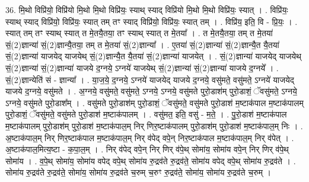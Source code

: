 \documentclass[17pt]{extarticle}
\begin{document}
36. मि॒थो विप्रि॑यो॒ विप्रि॑यो मि॒थो मि॒थो विप्रि॑यः॒ स्याथ् स्याद् विप्रि॑यो मि॒थो मि॒थो विप्रि॑यः॒ स्यात् । . विप्रि॑यः॒ स्याथ् स्याद् विप्रि॑यो॒ विप्रि॑यः॒ स्यात् तम् तꣳ स्याद् विप्रि॑यो॒ विप्रि॑यः॒ स्यात् तम् । . विप्रि॑य॒ इति॒ वि - प्रि॒यः॒ । . स्यात् तम् तꣳ स्याथ् स्यात् त मे॒तयै॒तया॒ तꣳ स्याथ् स्यात् त मे॒तया᳚ । . त मे॒तयै॒तया॒ तम् त मे॒तया॑ सं॒(2)ज्ञान्या॑ सं॒(2)ज्ञान्यै॒तया॒ तम् त मे॒तया॑ सं॒(2)ज्ञान्या᳚ । . ए॒तया॑ सं॒(2)ज्ञान्या॑ सं॒(2)ज्ञान्यै॒त यै॒तया॑ सं॒(2)ज्ञान्या॑ याजयेद् याजयेथ् सं॒(2)ज्ञान्यै॒त यै॒तया॑ सं॒(2)ज्ञान्या॑ याजयेत् । . सं॒(2)ज्ञान्या॑ याजयेद् याजयेथ् सं॒(2)ज्ञान्या॑ सं॒(2)ज्ञान्या॑ याजये द॒ग्नये॒ ऽग्नये॑ याजयेथ् सं॒(2)ज्ञान्या॑ 
सं॒(2)ज्ञान्या॑ याजये द॒ग्नये᳚ । . सं॒(2)ज्ञान्येति॑ सं - ज्ञान्या᳚ । . या॒ज॒ये॒ द॒ग्नये॒ ऽग्नये॑ याजयेद् याजये द॒ग्नये॒ वसु॑मते॒ वसु॑मते॒ ऽग्नये॑ याजयेद् याजये द॒ग्नये॒ वसु॑मते । . अ॒ग्नये॒ वसु॑मते॒ वसु॑मते॒ ऽग्नये॒ ऽग्नये॒ वसु॑मते पुरो॒डाश॑म् पुरो॒डाशं॒ ॅवसु॑मते॒ ऽग्नये॒ ऽग्नये॒ वसु॑मते पुरो॒डाश᳚म् । . वसु॑मते पुरो॒डाश॑म् पुरो॒डाशं॒ ॅवसु॑मते॒ वसु॑मते पुरो॒डाश॑ म॒ष्टाक॑पाल म॒ष्टाक॑पालम् पुरो॒डाशं॒ ॅवसु॑मते॒ वसु॑मते पुरो॒डाश॑ म॒ष्टाक॑पालम् । . वसु॑मत॒ इति॒ वसु॑ - म॒ते॒ । . पु॒रो॒डाश॑ म॒ष्टाक॑पाल म॒ष्टाक॑पालम् पुरो॒डाश॑म् पुरो॒डाश॑ म॒ष्टाक॑पाल॒म् निर् णिर॒ष्टाक॑पालम् पुरो॒डाश॑म् पुरो॒डाश॑ म॒ष्टाक॑पाल॒म् निः । . अ॒ष्टाक॑पाल॒म् निर् णिर॒ष्टाक॑पाल म॒ष्टाक॑पाल॒म् निर् व॑पेद् वपे॒न् निर॒ष्टाक॑पाल म॒ष्टाक॑पाल॒म् निर् व॑पेत् । . अ॒ष्टाक॑पाल॒मित्य॒ष्टा - क॒पा॒ल॒म् । . निर् व॑पेद् वपे॒न् निर् णिर् व॑पे॒थ् सोमा॑य॒ सोमा॑य वपे॒न् निर् णिर् व॑पे॒थ् सोमा॑य । . व॒पे॒थ् सोमा॑य॒ सोमा॑य वपेद् वपे॒थ् सोमा॑य रु॒द्रव॑ते रु॒द्रव॑ते॒ सोमा॑य वपेद् वपे॒थ् सोमा॑य रु॒द्रव॑ते । . सोमा॑य रु॒द्रव॑ते रु॒द्रव॑ते॒ सोमा॑य॒ सोमा॑य रु॒द्रव॑ते च॒रुम् च॒रुꣳ रु॒द्रव॑ते॒ सोमा॑य॒ सोमा॑य रु॒द्रव॑ते च॒रुम् । \newline
\end{document}
